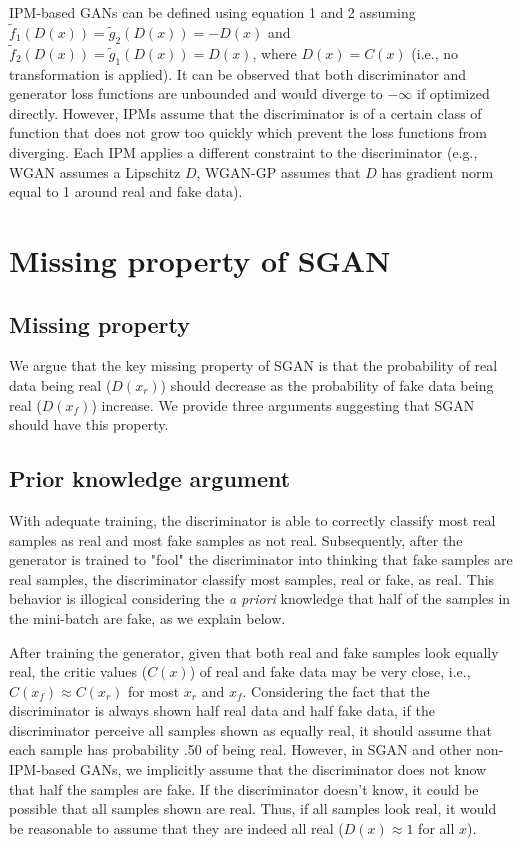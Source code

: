 \documentclass{article}
\begin{document}
IPM-based GANs can be defined using equation 1 and 2 assuming $\tilde{f}_1(D(x))=\tilde{g}_2(D(x))=-D(x)$ and $\tilde{f}_2(D(x))=\tilde{g}_1(D(x))=D(x)$, where $D(x)=C(x)$ (i.e., no transformation is applied). It can be observed that both discriminator and generator loss functions are unbounded and would diverge to $-\infty$ if optimized directly. However, IPMs assume that the discriminator is of a certain class of function that does not grow too quickly which prevent the loss functions from diverging. Each IPM applies a different constraint to the discriminator (e.g., WGAN assumes a Lipschitz $D$, WGAN-GP assumes that $D$ has gradient norm equal to 1 around real and fake data).

\section{Missing property of SGAN}

\subsection{Missing property}

We argue that the key missing property of SGAN is that the probability of real data being real ($D(x_{r})$) should decrease as the probability of fake data being real ($D(x_{f})$) increase. We provide three arguments suggesting that SGAN should have this property.

\subsection{Prior knowledge argument}

With adequate training, the discriminator is able to correctly classify most real samples as real and most fake samples as not real. Subsequently, after the generator is trained to "fool" the discriminator into thinking that fake samples are real samples, the discriminator classify most samples, real or fake, as real. This behavior is illogical considering the \textit{a priori} knowledge that half of the samples in the mini-batch are fake, as we explain below. 

After training the generator, given that both real and fake samples look equally real, the critic values ($C(x)$) of real and fake data may be very close, i.e., $C(x_f) \approx C(x_r)$ for most $x_r$ and $x_f$. Considering the fact that the discriminator is always shown half real data and half fake data, if the discriminator perceive all samples shown as equally real, it should assume that each sample has probability .50 of being real. However, in SGAN and other non-IPM-based GANs, we implicitly assume that the discriminator does not know that half the samples are fake. If the discriminator doesn't know, it could be possible that all samples shown are real. Thus, if all samples look real, it would be reasonable to assume that they are indeed all real ($D(x)\approx 1$ for all $x$).
\end{document}
